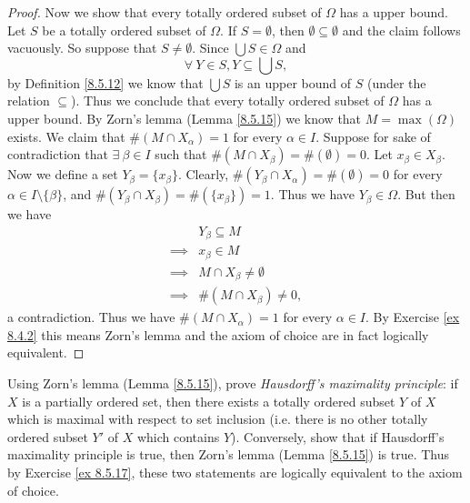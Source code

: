 \begin{proof}
    Now we show that every totally ordered subset of \(\Omega\) has a upper bound.
    Let \(S\) be a totally ordered subset of \(\Omega\).
    If \(S = \emptyset\), then \(\emptyset \subseteq \emptyset\) and the claim follows vacuously.
    So suppose that \(S \neq \emptyset\).
    Since \(\bigcup S \in \Omega\) and
    \[
        \forall\ Y \in S, Y \subseteq \bigcup S,
    \]
    by Definition \ref{8.5.12} we know that \(\bigcup S\) is an upper bound of \(S\) (under the relation \(\subseteq\)).
    Thus we conclude that every totally ordered subset of \(\Omega\) has a upper bound.
    By Zorn's lemma (Lemma \ref{8.5.15}) we know that \(M = \max(\Omega)\) exists.
    We claim that \(\#(M \cap X_{\alpha}) = 1\) for every \(\alpha \in I\).
    Suppose for sake of contradiction that \(\exists\ \beta \in I\) such that \(\#(M \cap X_{\beta}) = \#(\emptyset) = 0\).
    Let \(x_{\beta} \in X_{\beta}\).
    Now we define a set \(Y_{\beta} = \{x_{\beta}\}\).
    Clearly, \(\#(Y_{\beta} \cap X_{\alpha}) = \#(\emptyset) = 0\) for every \(\alpha \in I \setminus \{\beta\}\), and \(\#(Y_{\beta} \cap X_{\beta}) = \#(\{x_{\beta}\}) = 1\).
    Thus we have \(Y_{\beta} \in \Omega\).
    But then we have
    \begin{align*}
                 & Y_{\beta} \subseteq M           \\
        \implies & x_{\beta} \in M                 \\
        \implies & M \cap X_{\beta} \neq \emptyset \\
        \implies & \#(M \cap X_{\beta}) \neq 0,
    \end{align*}
    a contradiction.
    Thus we have \(\#(M \cap X_{\alpha}) = 1\) for every \(\alpha \in I\).
    By Exercise \ref{ex 8.4.2} this means Zorn's lemma and the axiom of choice are in fact logically equivalent.
\end{proof}

\begin{exercise}\label{ex 8.5.18}
    Using Zorn's lemma (Lemma \ref{8.5.15}), prove \emph{Hausdorff's maximality principle}:
    if \(X\) is a partially ordered set, then there exists a totally ordered subset \(Y\) of \(X\) which is maximal with respect to set inclusion
    (i.e. there is no other totally ordered subset \(Y'\) of \(X\) which contains \(Y\)).
    Conversely, show that if Hausdorff's maximality principle is true, then Zorn's lemma (Lemma \ref{8.5.15}) is true.
    Thus by Exercise \ref{ex 8.5.17}, these two statements are logically equivalent to the axiom of choice.
\end{exercise}


